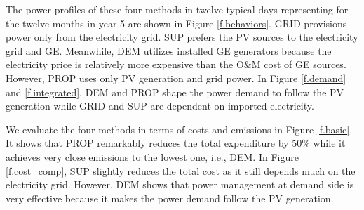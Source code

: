 The power profiles of these four methods in twelve typical days representing for the twelve months in year 5 are shown in Figure \ref{f.behaviors}.
GRID provisions power only from the electricity grid. SUP prefers the PV sources to the electricity grid and GE. Meanwhile, DEM utilizes installed GE generators because the electricity price is relatively more expensive than the O\&M cost of GE sources. However, PROP uses only PV generation and grid power. In Figure \ref{f.demand} and \ref{f.integrated}, DEM and PROP shape the power demand to follow the PV generation while GRID and SUP are dependent on imported electricity.

We evaluate the four methods in terms of costs and emissions in Figure \ref{f.basic}. It shows that PROP remarkably reduces the total expenditure by 50\% while it achieves very close emissions to the lowest one, i.e., DEM. In Figure \ref{f.cost_comp}, SUP slightly reduces the total cost as it still depends much on the electricity grid. However, DEM shows that power management at demand side is very effective because it makes the power demand follow the PV generation.


